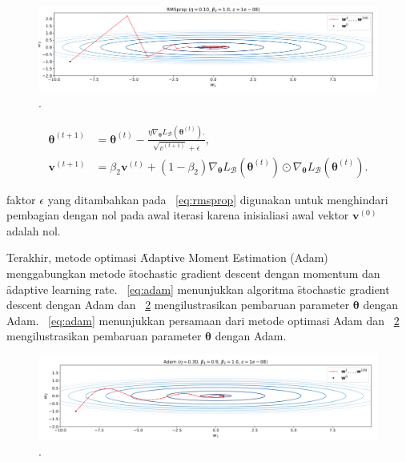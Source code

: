 \begin{figure}
    \centering
    \includegraphics[width=1\textwidth]{assets/pics/RMSPROP.png}
    \caption{\license.}
    \label{fig:rmsprop}
\end{figure}

\begin{align}
    \label{eq:rmsprop}
    \bm{\theta}^{(t+1)} &= \bm{\theta}^{(t)} - \frac{\eta \nabla_{\bm{\theta}} L_{\mathcal{B}}(\bm{\theta}^{(t)}).}{\sqrt{v^{(t+1)}} + \epsilon}, \\
    \bm{v}^{(t+1)} &= \beta_2 \bm{v}^{(t)} + (1 - \beta_2) \nabla_{\bm{\theta}} L_{\mathcal{B}}(\bm{\theta}^{(t)})\odot \nabla_{\bm{\theta}} L_{\mathcal{B}}(\bm{\theta}^{(t)}).
\end{align}

faktor $\epsilon$ yang ditambahkan pada \equ~\ref{eq:rmsprop} digunakan untuk menghindari pembagian dengan nol pada awal iterasi karena inisialiasi awal vektor $\bm{v}^{(0)}$ adalah nol.

Terakhir, metode optimasi \f{Adaptive Moment Estimation} (Adam) menggabungkan metode \f{stochastic gradient descent} dengan momentum dan \f{adaptive learning rate}. \equ~\ref{eq:adam} menunjukkan algoritma \f{stochastic gradient descent} dengan Adam dan \pic~\ref{fig:adam} mengilustrasikan pembaruan parameter $\bm{\theta}$ dengan Adam. \equ~\ref{eq:adam} menunjukkan persamaan dari metode optimasi Adam dan \pic~\ref{fig:adam} mengilustrasikan pembaruan parameter $\bm{\theta}$ dengan Adam.

\begin{figure}
    \centering
    \includegraphics[width=1\textwidth]{assets/pics/adam.png}
    \caption{\license.}
    \label{fig:adam}
\end{figure}

